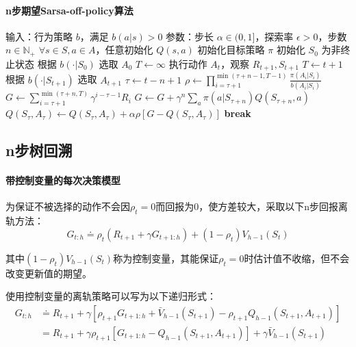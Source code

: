 \documentclass[
12pt, %
a4paper, 
oneside, %
headinclude,footinclude, %
]{scrartcl}
\begin{document}
\paragraph{n步期望Sarsa-off-policy算法}
\begin{myalgorithm}
\State 输入：行为策略 $b$，满足 $b(a|s) > 0$
\State 参数：步长 $\alpha \in (0,1]$，探索率 $\epsilon > 0$，步数 $n \in \mathbb{N}_+$
\State $\forall s \in S, a \in A$，任意初始化 $Q(s, a)$
\State 初始化目标策略 $\pi$
    \State 初始化 $S_0$ 为非终止状态
    \State 根据 $b(\cdot|S_0)$ 选取 $A_0$
    \State $T \gets \infty$
            \State 执行动作 $A_t$，观察 $R_{t+1}, S_{t+1}$
                \State $T \gets t+1$
            \Else
                \State 根据 $b(\cdot|S_{t+1})$ 选取 $A_{t+1}$
            \EndIf
        \EndIf
        \State $\tau \gets t-n+1$ 
            \State $\rho \gets \prod_{i=\tau+1}^{\min(\tau+n-1,T-1)} \frac{\pi(A_i|S_i)}{b(A_i|S_i)}$ 
            \State $G \gets \sum_{i=\tau+1}^{\min(\tau+n,T)} \gamma^{i-\tau-1}R_i$
                \State $G \gets G + \gamma^n \sum_a\pi(a|S_{\tau+n})Q(S_{\tau+n}, a)$ 
            \EndIf
            \State $Q(S_{\tau},A_{\tau}) \gets Q(S_{\tau},A_{\tau}) + \alpha \rho[G - Q(S_{\tau},A_{\tau})]$
        \EndIf
            \State \textbf{break}
        \EndIf
    \EndFor
\EndFor
\end{myalgorithm}
\subsection{n步树回溯}
\paragraph{带控制变量的每次决策模型}
为保证不被选择的动作不会因$ \rho_t = 0 $而回报为$ 0 $，使方差较大，采取以下n步回报离轨方法：
$$ G_{t:h} \doteq \rho_t (R_{t + 1} + \gamma G_{t + 1:h}) + (1 - \rho_t) V_{h - 1}(S_t) $$

其中$ (1 - \rho_t) V_{h - 1}(S_t) $称为控制变量，其能保证$ \rho_t = 0 $时估计值不收缩，但不会改变更新值的期望。

使用控制变量的离轨策略可以写为以下递归形式：
\begin{align*}
G_{t:h} 
&\doteq R_{t + 1} + \gamma[\rho_{t + 1} G_{t + 1:h} + \bar{V}_{h - 1}(S_{t + 1}) - \rho_{t + 1} Q_{h - 1}(S_{t + 1}, A_{t + 1})] \\
&= R_{t + 1} + \gamma \rho_{t + 1}[G_{t + 1:h} - Q_{h - 1}(S_{t + 1}, A_{t + 1})] + \gamma \bar{V}_{h - 1}(S_{t + 1})
\end{align*}
\end{document}
